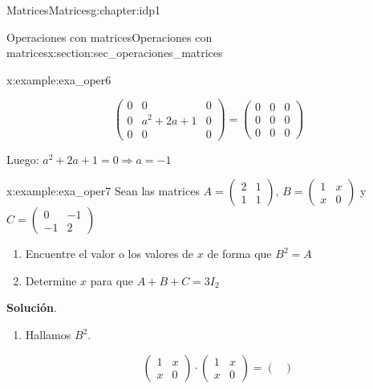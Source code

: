 \documentclass[oneside,12pt,]{book}
\newcommand{\blocktitlefont}{\relax}
\newcommand{\amp}{&}
\begin{document}
\begin{chapterptx}{Matrices}{}{Matrices}{}{}{g:chapter:idp1}
\begin{sectionptx}{Operaciones con matrices}{}{Operaciones con matrices}{}{}{x:section:sec_operaciones_matrices}
\begin{example}{}{x:example:exa_oper6}
\par
%
\begin{equation*}
\begin{pmatrix}
0 \amp 0 \amp 0 \\
0 \amp a^2+2a+1 \amp 0 \\
0 \amp 0 \amp 0 
\end{pmatrix}=
\begin{pmatrix}
0 \amp 0 \amp 0 \\
0 \amp 0 \amp 0 \\
0 \amp 0 \amp 0
\end{pmatrix}
\end{equation*}
%
\par
Luego: \(a^2+2a+1=0 \Rightarrow a=-1\)%
\end{example}
\begin{example}{}{x:example:exa_oper7}%
Sean las matrices \(A=\begin{pmatrix} 2 \amp 1 \\ 1 \amp 1 \end{pmatrix}\), \(B=\begin{pmatrix} 1 \amp x \\ x \amp 0  \end{pmatrix}\) y \(C=\begin{pmatrix} 0 \amp -1 \\ -1 \amp 2 \end{pmatrix}\)%
\par
%
\begin{enumerate}[label=\alph*]
\item{}Encuentre el valor o los valores de \(x\) de forma que \(B^2=A\)%
\item{}Determine \(x\) para que \(A+B+C=3I_2\)%
\end{enumerate}
%
\par\smallskip%
\noindent\textbf{\blocktitlefont Solución}.\hypertarget{g:solution:idp15}{}\quad{}%
\begin{enumerate}[label=\alph*]
\item{}Hallamos \(B^2\).%
\par
%
\begin{equation*}
\begin{pmatrix}
1 \amp x \\
x \amp 0 
\end{pmatrix} \cdot 
\begin{pmatrix}
1 \amp x \\
x \amp 0 
\end{pmatrix}=
\begin{pmatrix}

\end{pmatrix}
\end{equation*}
\end{enumerate}
\end{example}
\end{sectionptx}
\end{chapterptx}
\end{document}
